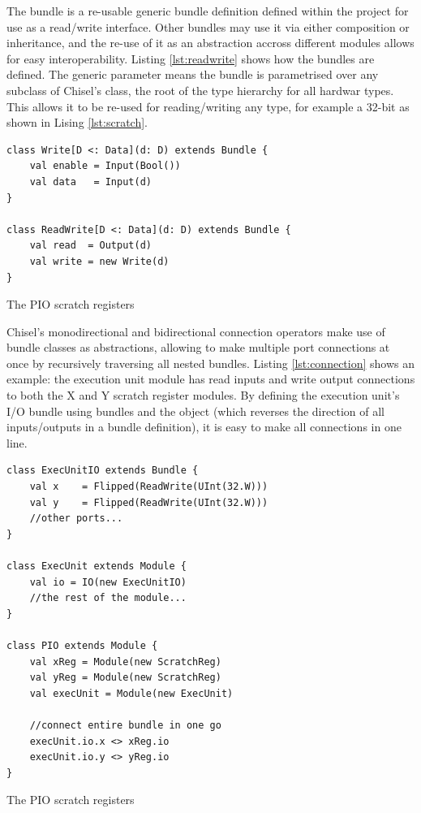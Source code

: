 The  bundle is a re-usable generic bundle definition defined within the project for use as a read/write interface. Other bundles may use it via either composition or inheritance, and the re-use of it as an abstraction accross different modules allows for easy interoperability. Listing \ref{lst:readwrite} shows how the bundles are defined. The generic parameter  means the bundle is parametrised over any subclass of Chisel's  class, the root of the type hierarchy for all hardwar types. This allows it to be re-used for reading/writing any type, for example a 32-bit  as shown in Lising \ref{lst:scratch}.

\begin{listing}[h!]
    \vspace{0.5cm}
    \begin{verbatim}
class Write[D <: Data](d: D) extends Bundle {
    val enable = Input(Bool())
    val data   = Input(d)
}

class ReadWrite[D <: Data](d: D) extends Bundle {
    val read  = Output(d)
    val write = new Write(d)
}
    \end{verbatim}
    \caption{The PIO scratch registers}
    \label{lst:readwrite}
\end{listing}

Chisel's monodirectional \txt{:=} and bidirectional \txt{<>} connection operators make use of bundle classes as abstractions, allowing to make multiple port connections at once by recursively traversing all nested bundles. Listing \ref{lst:connection} shows an example: the execution unit module has read inputs and write output connections to both the X and Y scratch register modules. By defining the execution unit's I/O bundle using  bundles and the  object (which reverses the direction of all inputs/outputs in a bundle definition), it is easy to make all connections in one line.

\begin{listing}[h!]
    \vspace{0.5cm}
    \begin{verbatim}
class ExecUnitIO extends Bundle {
    val x    = Flipped(ReadWrite(UInt(32.W)))
    val y    = Flipped(ReadWrite(UInt(32.W)))
    //other ports...          
}

class ExecUnit extends Module {
    val io = IO(new ExecUnitIO)
    //the rest of the module...
}

class PIO extends Module {
    val xReg = Module(new ScratchReg)
    val yReg = Module(new ScratchReg)
    val execUnit = Module(new ExecUnit)

    //connect entire bundle in one go
    execUnit.io.x <> xReg.io
    execUnit.io.y <> yReg.io
}
    \end{verbatim}
    \caption{The PIO scratch registers}
    \label{lst:connection}
\end{listing}

